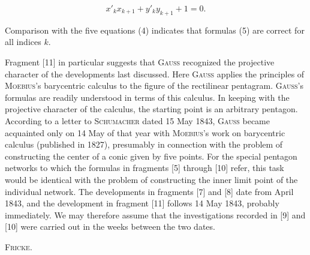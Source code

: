 \[
x'_k x_{k+1} + y'_k y_{k+1} + 1 = 0.
\]

Comparison with the five equations (4) indicates that formulas (5) are correct for all indices $k$.

Fragment [11] in particular suggests that \textsc{Gauss} recognized the projective character of the developments last discussed. Here \textsc{Gauss} applies the principles of \textsc{Moebius}'s barycentric calculus to the figure of the rectilinear pentagram. \textsc{Gauss}'s formulas are readily understood in terms of this calculus. In keeping with the projective character of the calculus, the starting point is an arbitrary pentagon. According to a letter to \textsc{Schumacher} dated 15 May 1843, \textsc{Gauss} became acquainted only on 14 May of that year with \textsc{Moebius}'s work on barycentric calculus (published in 1827), presumably in connection with the problem of constructing the center of a conic given by five points. For the special pentagon networks to which the formulas in fragments [5] through [10] refer, this task would be identical with the problem of constructing the inner limit point of the individual network. The developments in fragments [7] and [8] date from April 1843, and the development in fragment [11] follows 14 May 1843, probably immediately. We may therefore assume that the investigations recorded in [9] and [10] were carried out in the weeks between the two dates.

\hfill\textsc{Fricke}.

\noindent\hrulefill\par
